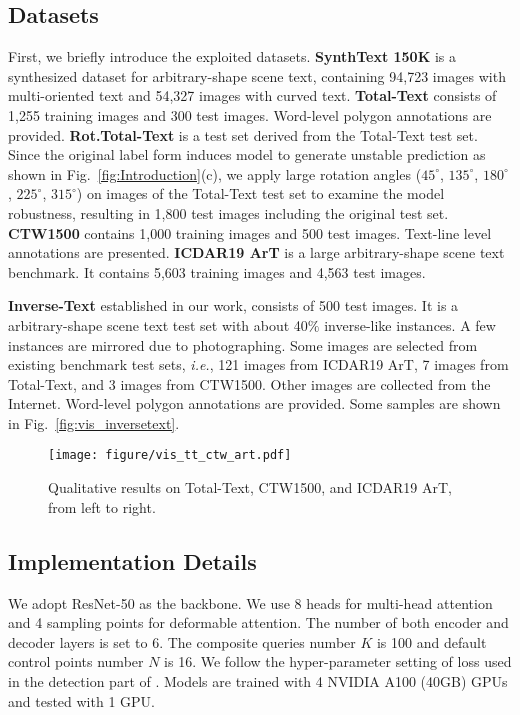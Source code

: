 \documentclass[letterpaper]{article} \usepackage{aaai23}  \usepackage{times}  \usepackage{helvet}  \usepackage{courier}  \usepackage[hyphens]{url}  \usepackage{graphicx} \urlstyle{rm}
\begin{document}
\subsection{Datasets}
First, we briefly introduce the exploited datasets. \textbf{SynthText 150K} \cite{liu2020abcnet} is a synthesized dataset for arbitrary-shape scene text, containing 94,723 images with multi-oriented text and 54,327 images with curved text. \textbf{Total-Text} \cite{ch2020total} consists of 1,255 training images and 300 test images. Word-level polygon annotations are provided. \textbf{Rot.Total-Text} is a test set derived from the Total-Text test set. Since the original label form induces model to generate unstable prediction as shown in Fig.~\ref{fig:Introduction}(c), we apply large rotation angles ($45^{\circ}$, $135^{\circ}$, $180^{\circ}$, $225^{\circ}$, $315^{\circ}$) on images of the Total-Text test set to examine the model robustness, resulting in 1,800 test images including the original test set. \textbf{CTW1500} \cite{liu2019curved} contains 1,000 training images and 500 test images. Text-line level annotations are presented. \textbf{ICDAR19 ArT} \cite{chng2019icdar2019} is a large arbitrary-shape scene text benchmark. It contains 5,603 training images and 4,563 test images. 

\textbf{Inverse-Text} established in our work, consists of 500 test images. It is a arbitrary-shape scene text test set with about 40$\%$ inverse-like instances. A few instances are mirrored due to photographing. Some images are selected from existing benchmark test sets, \emph{i.e.}, 121 images from ICDAR19 ArT, 7 images from Total-Text, and 3 images from CTW1500. Other images are collected from the Internet. Word-level polygon annotations are provided. Some samples are shown in Fig.~\ref{fig:vis_inversetext}. 

\begin{figure}[!t]
    \centering
    \texttt{[image: figure/vis\_tt\_ctw\_art.pdf]}
    \caption{Qualitative results on Total-Text, CTW1500, and ICDAR19 ArT, from left to right.}
    \label{fig:qualitative_tt_ctw_art}
\end{figure}


\subsection{Implementation Details}
\label{subsec:impl details}
We adopt ResNet-50 \cite{he2016deep} as the backbone. We use 8 heads for multi-head attention and 4 sampling points for deformable attention. The number of both encoder and decoder layers is set to 6. The composite queries number $K$ is 100 and default control points number $N$ is 16. We follow the hyper-parameter setting of loss used in the detection part of \cite{zhang2022text}. Models are trained with 4 NVIDIA A100 (40GB) GPUs and tested with 1 GPU.
\end{document}
